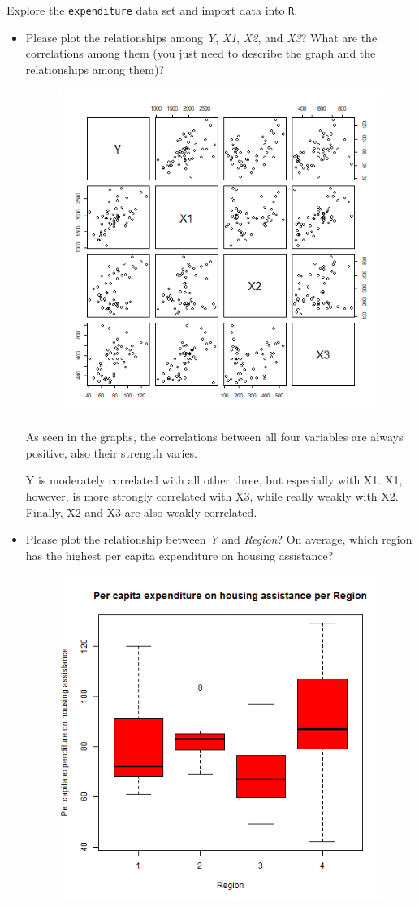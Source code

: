 \documentclass[12pt,letterpaper]{article}
\begin{document}
\vspace{.5cm}
\noindent Explore the \texttt{expenditure} data set and import data into \texttt{R}.
\vspace{.5cm}
  
\vspace{.5cm}
\begin{itemize}

\item
Please plot the relationships among \emph{Y}, \emph{X1}, \emph{X2}, and \emph{X3}? What are the correlations among them (you just need to describe the graph and the relationships among them)?

\begin{figure}[H]
	\centering
	\includegraphics[width=0.3\linewidth]{plot1.png}
\end{figure}

  



As seen in the graphs, the correlations between all four variables are always positive, also their strength varies.

Y is moderately correlated with all other three, but especially with X1. X1, however, is more strongly correlated with X3, while really weakly with X2. Finally, X2 and X3 are also weakly correlated.

\vspace{.5cm}
\item
Please plot the relationship between \emph{Y} and \emph{Region}? On average, which region has the highest per capita expenditure on housing assistance?

\begin{figure}[H]
	\centering
	\includegraphics[width=0.3\linewidth]{boxplot2.png}
\end{figure}


\end{itemize}
\end{document}
